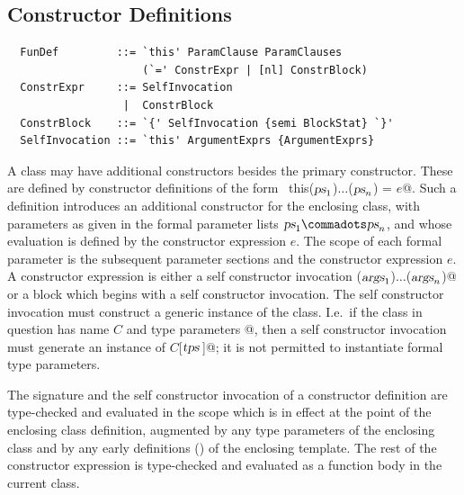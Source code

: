 
\subsection{Constructor Definitions}\label{sec:constr-defs}

\syntax\begin{lstlisting}
  FunDef         ::= `this' ParamClause ParamClauses 
                     (`=' ConstrExpr | [nl] ConstrBlock)
  ConstrExpr     ::= SelfInvocation
                  |  ConstrBlock
  ConstrBlock    ::= `{' SelfInvocation {semi BlockStat} `}'
  SelfInvocation ::= `this' ArgumentExprs {ArgumentExprs}
\end{lstlisting}

A class may have additional constructors besides the primary
constructor.  These are defined by constructor definitions of the form
~\lstinline@def this($\mbox{\sl ps}_1$)$\ldots$($\mbox{\sl ps}_n$) = $e$@.  Such a
definition introduces an additional constructor for the enclosing
class, with parameters as given in the formal parameter lists $\ps_1
\commadots \ps_n$, and whose evaluation is defined by the constructor
expression $e$.  The scope of each formal parameter is the subsequent
parameter sections and the constructor
expression $e$.  A constructor expression is either a self constructor
invocation \lstinline@this($\mbox{\sl args}_1$)$\ldots$($\mbox{\sl args}_n$)@ or a block
which begins with a self constructor invocation. The self constructor
invocation must construct a generic instance of the class. I.e.\ if the
class in question has name $C$ and type parameters
\lstinline@[$\tps\,$]@, then a self constructor invocation must
generate an instance of \lstinline@$C$[$\tps\,$]@; it is not permitted
to instantiate formal type parameters.

The signature and the self constructor invocation of a constructor
definition are type-checked and evaluated in the scope which is in
effect at the point of the enclosing class definition, augmented by
any type parameters of the enclosing class and by any early
definitions () of the enclosing template.
The rest of the
constructor expression is type-checked and evaluated as a function
body in the current class.
  
